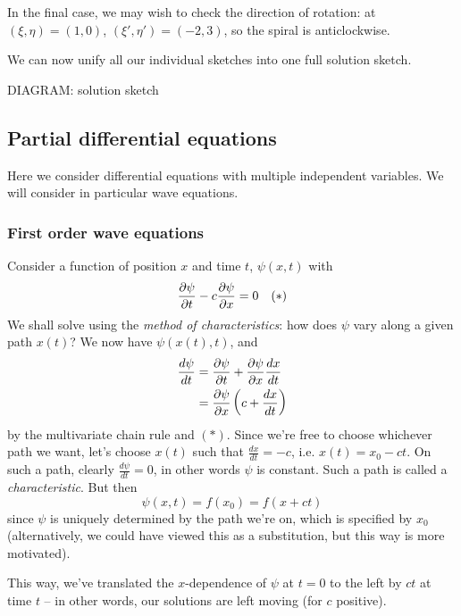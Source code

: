 \documentclass{../../template/note}
\begin{document}
\begin{example}
\begin{center}
            
        \end{center}
        In the final case, we may wish to check the direction of rotation: at \((\xi, \eta) = (1, 0)\), \((\xi', \eta') = (-2, 3)\), so the spiral is anticlockwise.

        We can now unify all our individual sketches into one full solution sketch.

        DIAGRAM: solution sketch
    \end{example}
    
    \subsection{Partial differential equations}

    Here we consider differential equations with multiple independent variables. We will consider in particular wave equations.
    
    \subsubsection{First order wave equations}
    
    Consider a function of position \(x\) and time \(t\), \(\psi(x, t)\) with
    \begin{align*}
        \pd \psi t - c \pd \psi x = 0 && (*)
    \end{align*}
    We shall solve using the \emph{method of characteristics}: how does \(\psi\) vary along a given path \(x(t)\)? We now have \(\psi(x(t), t)\), and
    \begin{align*}
        \frac{d\psi}{dt} &= \pd \psi t + \pd \psi x \frac{dx}{dt} \\
        &= \pd \psi x \left(c + \frac{dx}{dt}\right)
    \end{align*}
    by the multivariate chain rule and \((*)\). Since we're free to choose whichever path we want, let's choose \(x(t)\) such that \(\frac{dx}{dt} = -c\), i.e. \(x(t) = x_0 - ct\). On such a path, clearly \(\frac{d\psi}{dt} = 0\), in other words \(\psi\) is constant. Such a path is called a \emph{characteristic}. But then
    \[
        \psi(x, t) = f(x_0) = f(x + ct)
    \]
    since \(\psi\) is uniquely determined by the path we're on, which is specified by \(x_0\) (alternatively, we could have viewed this as a substitution, but this way is more motivated).


    This way, we've translated the \(x\)-dependence of \(\psi\) at \(t=0\) to the left by \(ct\) at time \(t\) -- in other words, our solutions are left moving (for \(c\) positive).
\end{document}
